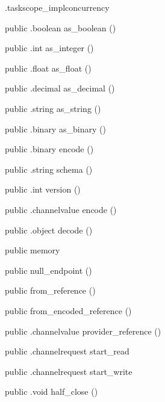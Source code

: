 \begin{CrexxClass}{.taskscope\_impl}{concurrency}
\begin{Members}
    \Method
      {public}
      {.boolean}
      {as\_boolean}
      {()}

    \Method
      {public}
      {.int}
      {as\_integer}
      {()}

    \Method
      {public}
      {.float}
      {as\_float}
      {()}

    \Method
      {public}
      {.decimal}
      {as\_decimal}
      {()}

    \Method
      {public}
      {.string}
      {as\_string}
      {()}

    \Method
      {public}
      {.binary}
      {as\_binary}
      {()}

    \Method
      {public}
      {.binary}
      {encode}
      {()}

    \Method
      {public}
      {.string}
      {schema}
      {()}

    \Method
      {public}
      {.int}
      {version}
      {()}

    \Method
      {public}
      {.channelvalue}
      {encode}
      {()}

    \Method
      {public}
      {.object}
      {decode}
      {()}

    \Factory
      {public}
      {memory}
      {}

    \Factory
      {public}
      {null\_endpoint}
      {()}

    \Factory
      {public}
      {from\_reference}
      {()}

    \Factory
      {public}
      {from\_encoded\_reference}
      {()}

    \Method
      {public}
      {.channelvalue}
      {provider\_reference}
      {()}

    \Method
      {public}
      {.channelrequest}
      {start\_read}
      {}

    \Method
      {public}
      {.channelrequest}
      {start\_write}
      {}

    \Method
      {public}
      {.void}
      {half\_close}
      {()}


\end{Members}
\end{CrexxClass}
